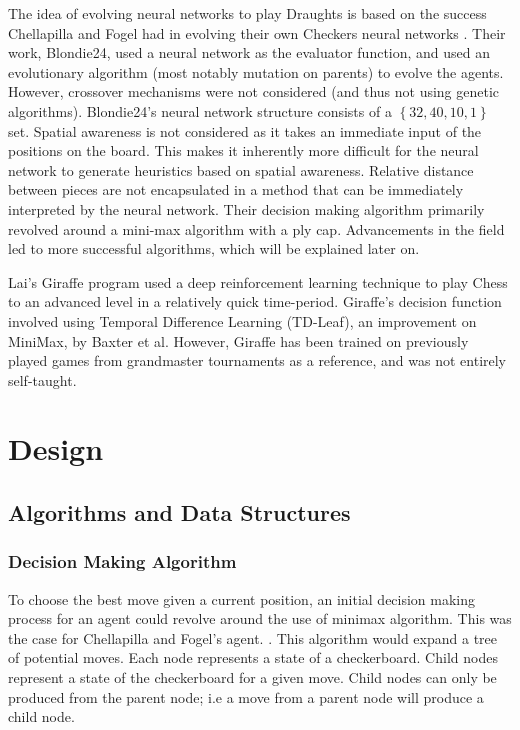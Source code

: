 \documentclass[12pt,a4paper]{article}
\begin{document}
    The idea of evolving neural networks to play Draughts is based on the success Chellapilla and Fogel had in evolving their own Checkers neural networks \cite{chellapilla_evolving_1999}. Their work, Blondie24, used a neural network as the evaluator function, and used an evolutionary algorithm (most notably mutation on parents) to evolve the agents. However, crossover mechanisms were not considered (and thus not using genetic algorithms). Blondie24's neural network structure consists of a $\left\{ 32,40,10,1 \right\}$ set. Spatial awareness is not considered as it takes an immediate input of the positions on the board. This makes it inherently more difficult for the neural network to generate heuristics based on spatial awareness. Relative distance between pieces are not encapsulated in a method that can be immediately interpreted by the neural network.
    Their decision making algorithm primarily revolved around a mini-max algorithm with a ply cap. Advancements in the field led to more successful algorithms, which will be explained later on. 
    
    Lai's Giraffe \cite{lai_giraffe:_2015} program used a deep reinforcement learning technique to play Chess to an advanced level in a relatively quick time-period. Giraffe's decision function involved using Temporal Difference Learning (TD-Leaf), an improvement on MiniMax, by Baxter et al. \cite{baxter_tdleaflambda_1999} However, Giraffe has been trained on previously played games from grandmaster tournaments as a reference, and was not entirely self-taught.


\section{Design}

\subsection*{Algorithms and Data Structures}

\subsubsection{Decision Making Algorithm}

    To choose the best move given a current position, an initial decision making process for an agent could revolve around the use of minimax algorithm. This was the case for Chellapilla and Fogel's agent. \cite{chellapilla_evolving_1999}. This algorithm would expand a tree of potential moves. Each node represents a state of a checkerboard. Child nodes represent a state of the checkerboard for a given move. Child nodes can only be produced from the parent node; i.e a move from a parent node will produce a child node. 
    
\end{document}
